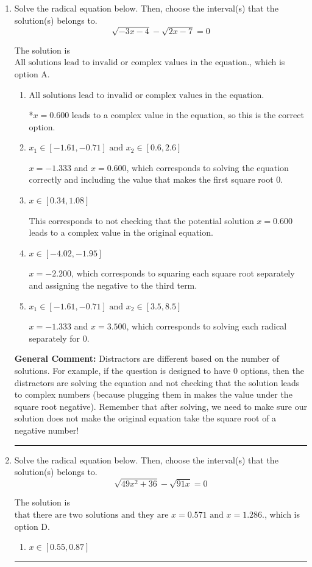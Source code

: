 \documentclass{extbook}[14pt]
\newcommand{\litem}[1]{\item #1

\rule{\textwidth}{0.4pt}}
\begin{document}
\begin{enumerate}\litem{
Solve the radical equation below. Then, choose the interval(s) that the solution(s) belongs to.
\[ \sqrt{-3 x - 4} - \sqrt{2 x - 7} = 0 \]

The solution is \( \text{All solutions lead to invalid or complex values in the equation.} \), which is option A.\begin{enumerate}[label=\Alph*.]
\item \( \text{All solutions lead to invalid or complex values in the equation.} \)

*$x = 0.600$ leads to a complex value in the equation, so this is the correct option.
\item \( x_1 \in [-1.61, -0.71] \text{ and } x_2 \in [0.6,2.6] \)

$x = -1.333$ and $x = 0.600$, which corresponds to solving the equation correctly and including the value that makes the first square root 0.
\item \( x \in [0.34,1.08] \)

This corresponds to not checking that the potential solution $x = 0.600$ leads to a complex value in the original equation.
\item \( x \in [-4.02,-1.95] \)

$x = -2.200$, which corresponds to squaring each square root separately and assigning the negative to the third term.
\item \( x_1 \in [-1.61, -0.71] \text{ and } x_2 \in [3.5,8.5] \)

$x = -1.333$ and $x = 3.500$, which corresponds to solving each radical separately for 0.
\end{enumerate}

\textbf{General Comment:} Distractors are different based on the number of solutions. For example, if the question is designed to have 0 options, then the distractors are solving the equation and not checking that the solution leads to complex numbers (because plugging them in makes the value under the square root negative). Remember that after solving, we need to make sure our solution does not make the original equation take the square root of a negative number!
}
\litem{
Solve the radical equation below. Then, choose the interval(s) that the solution(s) belongs to.
\[ \sqrt{49 x^2 + 36} - \sqrt{91 x} = 0 \]

The solution is \( \text{that there are two solutions and they are } x = 0.571 \text{ and } x = 1.286. \), which is option D.\begin{enumerate}[label=\Alph*.]
\item \( x \in [0.55,0.87] \)


\end{enumerate}}
\end{enumerate}
\end{document}
